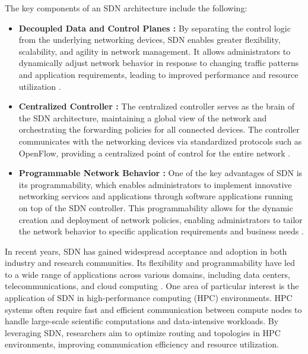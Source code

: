 The key components of an SDN architecture include the following:

\begin{itemize}

\item \textbf{Decoupled Data and Control Planes :} By separating the control logic from the underlying networking devices, SDN enables greater flexibility, scalability, and agility in network management. It allows administrators to dynamically adjust network behavior in response to changing traffic patterns and application requirements, leading to improved performance and resource utilization \cite{tr2016sdn, kreutz2014software}.

\item \textbf{Centralized Controller :} The centralized controller serves as the brain of the SDN architecture, maintaining a global view of the network and orchestrating the forwarding policies for all connected devices. The controller communicates with the networking devices via standardized protocols such as OpenFlow, providing a centralized point of control for the entire network \cite{tr2016sdn, kreutz2014software}.

\item \textbf{Programmable Network Behavior :} One of the key advantages of SDN is its programmability, which enables administrators to implement innovative networking services and applications through software applications running on top of the SDN controller. This programmability allows for the dynamic creation and deployment of network policies, enabling administrators to tailor the network behavior to specific application requirements and business needs \cite{tr2016sdn, kreutz2014software}.

\end{itemize}




In recent years, SDN has gained widespread acceptance and adoption in both industry and research communities. Its flexibility and programmability have led to a wide range of applications across various domains, including data centers, telecommunications, and cloud computing \cite{alalmaei2020sdn, faizian2017comparative}. 
One area of particular interest is the application of SDN in high-performance computing (HPC) environments. HPC systems often require fast and efficient communication between compute nodes to handle large-scale scientific computations and data-intensive workloads. By leveraging SDN, researchers aim to optimize routing and topologies in HPC environments, improving communication efficiency and resource utilization.

